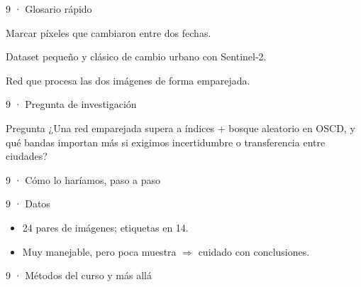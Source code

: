 \begin{frame}{9 · Glosario rápido}
  \begin{description}[font=\bfseries\scriptsize,style=nextline,leftmargin=1.5cm]
    \item[Change detection] Marcar píxeles que cambiaron entre dos fechas.
    \item[OSCD] Dataset pequeño y clásico de cambio urbano con Sentinel-2.
    \item[Siamesa] Red que procesa las dos imágenes de forma emparejada.
  \end{description}
\end{frame}

\begin{frame}{9 · Pregunta de investigación}
  \begin{block}{Pregunta}
    ¿Una red emparejada supera a índices + bosque aleatorio en OSCD, y qué bandas importan más si exigimos incertidumbre o transferencia entre ciudades?
  \end{block}
\end{frame}

\begin{frame}{9 · Cómo lo haríamos, paso a paso}
\end{frame}

\begin{frame}{9 · Datos}
  \begin{itemize}
    \item 24 pares de imágenes; etiquetas en 14.
    \item Muy manejable, pero poca muestra $\Rightarrow$ cuidado con conclusiones.
  \end{itemize}
\end{frame}

\begin{frame}{9 · Métodos del curso y más allá}
\end{frame}

